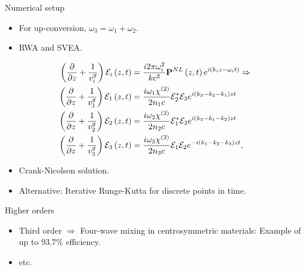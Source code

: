 \begin{frame}{Numerical setup}
  \begin{itemize}
  \item For up-conversion, $\omega_{3} = \omega_{1} + \omega_{2}$.
  \item RWA and SVEA.
\end{itemize}

\begin{align*}
\paren{ \pdiff{}{z}  + \frac{1}{v_i^{g}} } \mathcal{E}_i \paren{z, t}
&= \frac{i 2 \pi \omega_i^{2}}{k c^2} \mathbf{P}^{NL} \paren{z,t} e^{i \paren{k_i z - \omega_{i}
    t}} \Rightarrow \\%
\paren{ \pdiff{}{z}  + \frac{1}{v_1^{g}} } \mathcal{E}_1 \paren{z, t}
&= \frac{i \omega_1 \chi^{(2)}}{2 n_1 c} \mathcal{E}_2^{*}\mathcal{E}_3 e^{i (k_3 - k_2 -k_1) z
t} \\
\paren{ \pdiff{}{z}  + \frac{1}{v_2^{g}} } \mathcal{E}_2 \paren{z, t}
&= \frac{i \omega_2 \chi^{(2)}}{2 n_2 c} \mathcal{E}_1^{*}\mathcal{E}_3 e^{i (k_3 - k_1 -k_2) z
t} \\
\paren{ \pdiff{}{z}  + \frac{1}{v_3^{g}} } \mathcal{E}_3 \paren{z, t}
&= \frac{i \omega_3 \chi^{(2)}}{2 n_3 c} \mathcal{E}_1\mathcal{E}_2 e^{-i (k_1 - k_2 -k_3) z
t}, \\
\end{align*}

\begin{itemize}
\item Crank-Nicolson solution.
\item Alternative: Iterative Runge-Kutta for discrete points in time.
\end{itemize}


\end{frame}
 



\begin{frame}{Higher orders}
  \begin{itemize} 
  \item Third order $\Rightarrow$ Four-wave mixing in centrosymmetric materials: Example of up to $93.7\%$ efficiency.
  \item etc.
  \end{itemize}

\end{frame}



